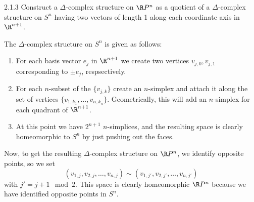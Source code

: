 \documentclass{article}
\begin{document}
\begin{exercise}{2.1.3}{\parindent}
  Construct a $\Delta$-complex structure on $\R P^n$ as a quotient of a
  $\Delta$-complex structure on $S^n$ having two vectors of length 1
  along each coordinate axis in $\R^{n+1}$.
\end{exercise}
\begin{solution}{\parindent}
  The $\Delta$-complex structure on $S^n$ is given as follows:
  \begin{enumerate}
  \item For each basis vector $e_j$ in $\R^{n+1}$ we create two
    vertices $v_{j,0},v_{j,1}$ corresponding to $\pm e_j$,
    respsectively.
  \item For each $n$-subset of the $\{v_{j,k}\}$ create an $n$-simplex
    and attach it along the set of vertices
    $\{v_{1,k_1},\ldots,v_{n,k_n}\}$. Geometrically, this will add an
    $n$-simplex for each quadrant of $\R^{n+1}$.
  \item At this point we have $2^{n+1}$ $n$-simplices, and the
    resulting space is clearly homeomorphic to $S^{n}$ by just pushing
    out the faces.
  \end{enumerate}
  Now, to get the resulting $\Delta$-complex structure on $\R P^{n}$,
  we identify opposite points, so we set
  \[
  (v_{1,j}, v_{2,j}, \ldots, v_{n,j}) \sim (v_{1,j'}, v_{2,j'},
  \ldots, v_{n,j'})
  \]
  with $j' = j+1 \mod 2$. This space is clearly homeomorphic $\R P^{n}$
  because we have identified opposite points in $S^n$.
\end{solution}
\end{document}
